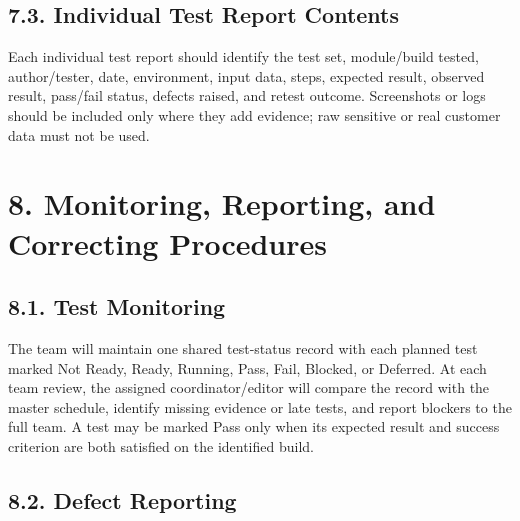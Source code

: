 \subsection{7.3. Individual Test Report Contents}\label{individual-test-report-contents}

Each individual test report should identify the test set, module/build tested, author/tester, date, environment, input data, steps, expected result, observed result, pass/fail status, defects raised, and retest outcome. Screenshots or logs should be included only where they add evidence; raw sensitive or real customer data must not be used.

\clearpage
\section{8. Monitoring, Reporting, and Correcting Procedures}\label{monitoring-reporting-and-correcting-procedures}

\subsection{8.1. Test Monitoring}\label{test-monitoring}

The team will maintain one shared test-status record with each planned test marked Not Ready, Ready, Running, Pass, Fail, Blocked, or Deferred. At each team review, the assigned coordinator/editor will compare the record with the master schedule, identify missing evidence or late tests, and report blockers to the full team. A test may be marked Pass only when its expected result and success criterion are both satisfied on the identified build.

\subsection{8.2. Defect Reporting}\label{defect-reporting}

